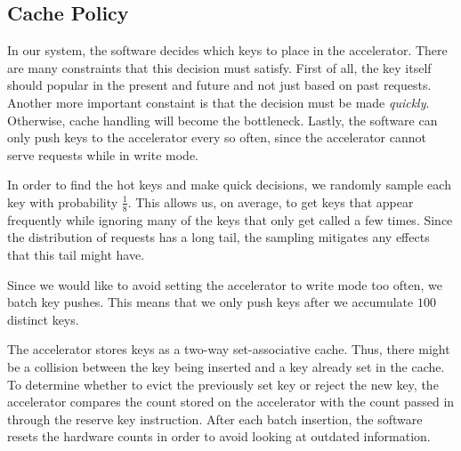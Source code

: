 \subsection{Cache Policy}

In our system, the software decides which keys to place in the
accelerator. There are many constraints that this decision must satisfy.
First of all, the key itself should popular in the present and future
and not just based on past requests. Another more important
constaint is that the decision must be made \emph{quickly}. Otherwise,
cache handling will become the bottleneck. Lastly, the software can only
push keys to the accelerator every so often, since the accelerator cannot
serve requests while in write mode.

In order to find the hot keys and make quick decisions, we randomly sample
each key with probability $\frac{1}{8}$. This allows us, on average, to get
keys that appear frequently while ignoring many of the keys that only get
called a few times. Since the distribution of requests has a long tail, the
sampling mitigates any effects that this tail might have.

Since we would like to avoid setting the accelerator to write mode too often,
we batch key pushes. This means that we only push keys after we accumulate
$100$ distinct keys.

The accelerator stores keys as a two-way set-associative cache. Thus, there might
be a collision between the key being inserted and a key already set in the cache.
To determine whether to evict the previously set key or reject the new key,
the accelerator compares the count stored on the accelerator with the count
passed in through the reserve key instruction. After each batch insertion,
the software resets the hardware counts in order to avoid looking at outdated
information.
